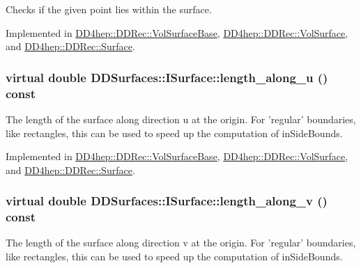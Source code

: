 Checks if the given point lies within the surface. 

Implemented in \hyperlink{class_d_d4hep_1_1_d_d_rec_1_1_vol_surface_base_aae8b494969fd257e4aa3e5b3d80cebb8}{DD4hep::DDRec::VolSurfaceBase}, \hyperlink{class_d_d4hep_1_1_d_d_rec_1_1_vol_surface_a6a3d39ebb8b0be132e4141cb9ea650a6}{DD4hep::DDRec::VolSurface}, and \hyperlink{class_d_d4hep_1_1_d_d_rec_1_1_surface_a2a86417b353cd25ee5bc96e8cc9dff2f}{DD4hep::DDRec::Surface}.\hypertarget{class_d_d_surfaces_1_1_i_surface_a0060710912d3447e296a8e0875690cc9}{
\subsubsection[{length\_\-along\_\-u}]{\setlength{\rightskip}{0pt plus 5cm}virtual double DDSurfaces::ISurface::length\_\-along\_\-u () const}}
\label{class_d_d_surfaces_1_1_i_surface_a0060710912d3447e296a8e0875690cc9}
The length of the surface along direction u at the origin. For 'regular' boundaries, like rectangles, this can be used to speed up the computation of inSideBounds. 

Implemented in \hyperlink{class_d_d4hep_1_1_d_d_rec_1_1_vol_surface_base_a11c8c2074c8f0e4af494aa6802be9372}{DD4hep::DDRec::VolSurfaceBase}, \hyperlink{class_d_d4hep_1_1_d_d_rec_1_1_vol_surface_ab4c1720db7c0170646211f26855ee38e}{DD4hep::DDRec::VolSurface}, and \hyperlink{class_d_d4hep_1_1_d_d_rec_1_1_surface_a2b027f9ee36a0e5a791b0cfa30199389}{DD4hep::DDRec::Surface}.\hypertarget{class_d_d_surfaces_1_1_i_surface_a9a4682bfa68557d53cfd319cfa54148d}{
\subsubsection[{length\_\-along\_\-v}]{\setlength{\rightskip}{0pt plus 5cm}virtual double DDSurfaces::ISurface::length\_\-along\_\-v () const}}
\label{class_d_d_surfaces_1_1_i_surface_a9a4682bfa68557d53cfd319cfa54148d}
The length of the surface along direction v at the origin. For 'regular' boundaries, like rectangles, this can be used to speed up the computation of inSideBounds. 


